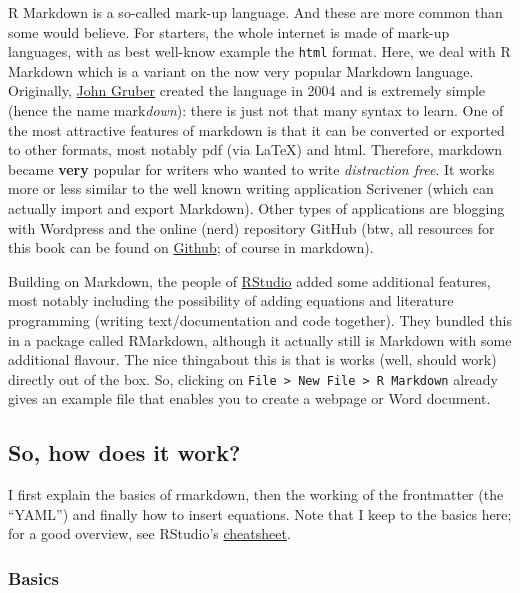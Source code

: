 \documentclass[]{article}
\theoremstyle{definition}
\theoremstyle{definition}
\theoremstyle{definition}
\theoremstyle{remark}
\begin{document}
R Markdown is a so-called mark-up language. And these are more common
than some would believe. For starters, the whole internet is made of
mark-up languages, with as best well-know example the \texttt{html}
format. Here, we deal with R Markdown which is a variant on the now very
popular Markdown language. Originally,
\href{https://daringfireball.net/projects/markdown/syntax}{John Gruber}
created the language in 2004 and is extremely simple (hence the name
mark\emph{down}): there is just not that many syntax to learn. One of
the most attractive features of markdown is that it can be converted or
exported to other formats, most notably pdf (via LaTeX) and html.
Therefore, markdown became \textbf{very} popular for writers who wanted
to write \emph{distraction free}. It works more or less similar to the
well known writing application Scrivener (which can actually import and
export Markdown). Other types of applications are blogging with
Wordpress and the online (nerd) repository GitHub (btw, all resources
for this book can be found on
\href{https://github.com/Thdegraaff/ResearchTools}{Github}; of course in
markdown).

Building on Markdown, the people of
\href{http://rmarkdown.rstudio.com}{RStudio} added some additional
features, most notably including the possibility of adding equations and
literature programming (writing text/documentation and code together).
They bundled this in a package called RMarkdown, although it actually
still is Markdown with some additional flavour. The nice thingabout this
is that is works (well, should work) directly out of the box. So,
clicking on
\texttt{File\ \textgreater{}\ New\ File\ \textgreater{}\ R\ Markdown}
already gives an example file that enables you to create a webpage or
Word document.

\subsection{So, how does it work?}\label{so-how-does-it-work}

I first explain the basics of rmarkdown, then the working of the
frontmatter (the ``YAML'') and finally how to insert equations. Note
that I keep to the basics here; for a good overview, see RStudio's
\href{https://www.rstudio.com/wp-content/uploads/2016/03/rmarkdown-cheatsheet-2.0.pdf}{cheatsheet}.

\subsubsection{Basics}\label{basics}
\end{document}
